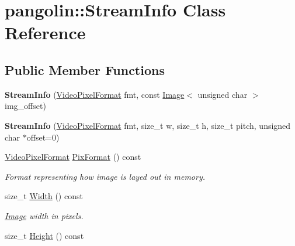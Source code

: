 \hypertarget{classpangolin_1_1_stream_info}{}\section{pangolin\+:\+:Stream\+Info Class Reference}
\label{classpangolin_1_1_stream_info}
\subsection*{Public Member Functions}
\begin{DoxyCompactItemize}
\item 
{\bfseries Stream\+Info} (\hyperlink{structpangolin_1_1_video_pixel_format}{Video\+Pixel\+Format} fmt, const \hyperlink{structpangolin_1_1_image}{Image}$<$ unsigned char $>$ img\+\_\+offset)\hypertarget{classpangolin_1_1_stream_info_acb39187d3f2ba7555130664804fa0459}{}\label{classpangolin_1_1_stream_info_acb39187d3f2ba7555130664804fa0459}

\item 
{\bfseries Stream\+Info} (\hyperlink{structpangolin_1_1_video_pixel_format}{Video\+Pixel\+Format} fmt, size\+\_\+t w, size\+\_\+t h, size\+\_\+t pitch, unsigned char $\ast$offset=0)\hypertarget{classpangolin_1_1_stream_info_a77f72472c2875b2bda2e0ac185acaa68}{}\label{classpangolin_1_1_stream_info_a77f72472c2875b2bda2e0ac185acaa68}

\item 
\hyperlink{structpangolin_1_1_video_pixel_format}{Video\+Pixel\+Format} \hyperlink{classpangolin_1_1_stream_info_abcda0cc5a6563084f9d242d225c51262}{Pix\+Format} () const \hypertarget{classpangolin_1_1_stream_info_abcda0cc5a6563084f9d242d225c51262}{}\label{classpangolin_1_1_stream_info_abcda0cc5a6563084f9d242d225c51262}

\begin{DoxyCompactList}\small\item\em Format representing how image is layed out in memory. \end{DoxyCompactList}\item 
size\+\_\+t \hyperlink{classpangolin_1_1_stream_info_a217608065e543a5cb33c6c52d60cb721}{Width} () const \hypertarget{classpangolin_1_1_stream_info_a217608065e543a5cb33c6c52d60cb721}{}\label{classpangolin_1_1_stream_info_a217608065e543a5cb33c6c52d60cb721}

\begin{DoxyCompactList}\small\item\em \hyperlink{structpangolin_1_1_image}{Image} width in pixels. \end{DoxyCompactList}\item 
size\+\_\+t \hyperlink{classpangolin_1_1_stream_info_aa6a95427f17d8065c12dded3aab3bb5e}{Height} () const \hypertarget{classpangolin_1_1_stream_info_aa6a95427f17d8065c12dded3aab3bb5e}{}\label{classpangolin_1_1_stream_info_aa6a95427f17d8065c12dded3aab3bb5e}


\end{DoxyCompactItemize}
